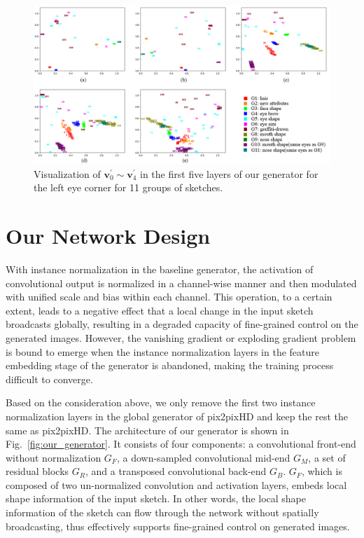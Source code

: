 \documentclass{article}
\begin{document}
\begin{figure}[htb]
	\centering
	\includegraphics[width=0.9 \textwidth]{pca_1.png}
	\caption{Visualization of  $\boldsymbol{v}_0^{'}\sim\boldsymbol{v}_4^{'}$ in the first five layers of our generator for the left eye corner for 11 groups of sketches.}
	\label{fig:pca_1}
\end{figure}


\section{Our Network Design}\label{sec:network}
%
 
With instance normalization in the baseline generator, the activation of convolutional output is normalized in a channel-wise manner and then modulated with unified scale and bias within each channel. 
This operation, to a certain extent, leads to a negative effect that a local change in the input sketch broadcasts globally, resulting in a degraded capacity of fine-grained control on the generated images.
However, the vanishing gradient or exploding gradient problem is bound to emerge when the instance normalization layers in the feature embedding stage of the generator is abandoned, making the training process difficult to converge. 
 
Based on the consideration above, we only remove the first two instance normalization layers in the global generator of pix2pixHD and keep the rest the same as pix2pixHD. 
The architecture of our generator is shown in Fig.~\ref{fig:our_generator}. 
It consists of four components: a convolutional front-end without normalization $G_F$, a down-sampled convolutional mid-end $G_M$, a set of residual blocks $G_R$, and a transposed convolutional back-end $G_B$.  
$G_F$, which is composed of two un-normalized convolution and activation layers, embeds local shape information of the input sketch.
In other words, the local shape information of the sketch can flow through the network without spatially broadcasting, thus effectively supports fine-grained control on generated images. 
\end{document}
